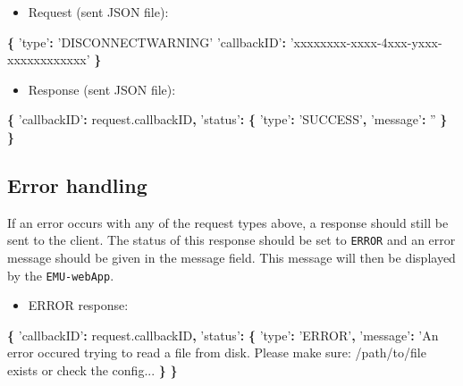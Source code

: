 \documentclass[]{book}
\newenvironment{Shaded}{\begin{snugshade}}{\end{snugshade}}
\newcommand{\AttributeTok}[1]{\textcolor[rgb]{0.77,0.63,0.00}{#1}}
\newcommand{\NormalTok}[1]{#1}
\newcommand{\OperatorTok}[1]{\textcolor[rgb]{0.81,0.36,0.00}{\textbf{#1}}}
\newcommand{\StringTok}[1]{\textcolor[rgb]{0.31,0.60,0.02}{#1}}
\newcommand{\VariableTok}[1]{\textcolor[rgb]{0.00,0.00,0.00}{#1}}
\providecommand{\tightlist}{%
  \setlength{\itemsep}{0pt}\setlength{\parskip}{0pt}}
\begin{document}
\begin{itemize}
\tightlist
\item
  Request (sent JSON file):
\end{itemize}

\begin{Shaded}
\begin{Highlighting}[]
\OperatorTok{\{}
  \StringTok{'type'}\OperatorTok{:} \StringTok{'DISCONNECTWARNING'}
  \StringTok{'callbackID'}\OperatorTok{:} \StringTok{'xxxxxxxx-xxxx-4xxx-yxxx-xxxxxxxxxxxx'}
\OperatorTok{\}}
\end{Highlighting}
\end{Shaded}

\begin{itemize}
\tightlist
\item
  Response (sent JSON file):
\end{itemize}

\begin{Shaded}
\begin{Highlighting}[]
\OperatorTok{\{}
  \StringTok{'callbackID'}\OperatorTok{:} \VariableTok{request}\NormalTok{.}\AttributeTok{callbackID}\OperatorTok{,}
  \StringTok{'status'}\OperatorTok{:} \OperatorTok{\{}
    \StringTok{'type'}\OperatorTok{:} \StringTok{'SUCCESS'}\OperatorTok{,}
    \StringTok{'message'}\OperatorTok{:} \StringTok{''}
  \OperatorTok{\}}
\OperatorTok{\}}
\end{Highlighting}
\end{Shaded}

\hypertarget{error-handling}{%
\subsection{Error handling}\label{error-handling}}

If an error occurs with any of the request types above, a response should still be sent to the client. The status of this response should be set to \texttt{ERROR} and an error message should be given in the message field. This message will then be displayed by the \texttt{EMU-webApp}.

\begin{itemize}
\tightlist
\item
  ERROR response:
\end{itemize}

\begin{Shaded}
\begin{Highlighting}[]
\OperatorTok{\{}
  \StringTok{'callbackID'}\OperatorTok{:} \VariableTok{request}\NormalTok{.}\AttributeTok{callbackID}\OperatorTok{,}
  \StringTok{'status'}\OperatorTok{:} \OperatorTok{\{}
    \StringTok{'type'}\OperatorTok{:} \StringTok{'ERROR'}\OperatorTok{,}
    \StringTok{'message'}\OperatorTok{:} \StringTok{'An error occured trying to read a file from disk. Please make sure: /path/to/file exists or check the config...}
  \OperatorTok{\}}
\OperatorTok{\}}
\end{Highlighting}
\end{Shaded}
\end{document}
